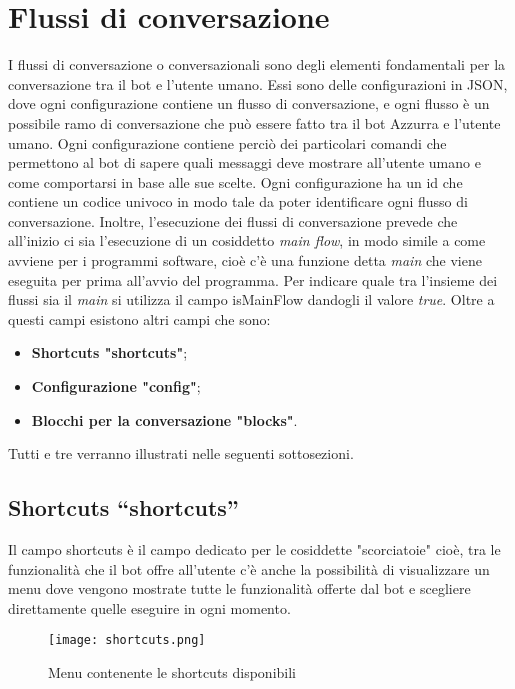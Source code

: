 \section{Flussi di conversazione}
I flussi di conversazione o conversazionali sono degli elementi fondamentali per la conversazione tra il bot e l'utente umano. Essi sono delle configurazioni in JSON, dove ogni configurazione contiene un flusso di conversazione, e ogni flusso è un possibile ramo di conversazione che può essere fatto tra il bot Azzurra e l'utente umano. Ogni configurazione contiene perciò dei particolari comandi che permettono al bot di sapere quali messaggi deve mostrare all'utente umano e come comportarsi in base alle sue scelte. Ogni configurazione ha un id che contiene un codice univoco in modo tale da poter identificare ogni flusso di conversazione. Inoltre, l'esecuzione dei flussi di conversazione prevede che all'inizio ci sia l'esecuzione di un cosiddetto \emph{main flow}, in modo simile a come avviene per i programmi software, cioè c'è una funzione detta \emph{main} che viene eseguita per prima all'avvio del programma. Per indicare quale tra l'insieme dei flussi sia il \emph{main} si utilizza il campo isMainFlow dandogli il valore \emph{true}.
Oltre a questi campi esistono altri campi che sono:\\
\begin{itemize}
	\item \textbf{Shortcuts "shortcuts"};
	\item \textbf{Configurazione "config"};
	\item \textbf{Blocchi per la conversazione "blocks"}.
\end{itemize}
Tutti e tre verranno illustrati nelle seguenti sottosezioni.
\subsection{Shortcuts “shortcuts”}
Il campo shortcuts è il campo dedicato per le cosiddette "scorciatoie" cioè, tra le funzionalità che il bot offre all'utente c'è anche la possibilità di visualizzare un menu dove vengono mostrate tutte le funzionalità offerte dal bot e scegliere direttamente quelle eseguire in ogni momento.

\begin{figure}[htbp]
	\centering
	\texttt{[image: shortcuts.png]}
	\caption{Menu contenente le shortcuts disponibili}
\end{figure}

